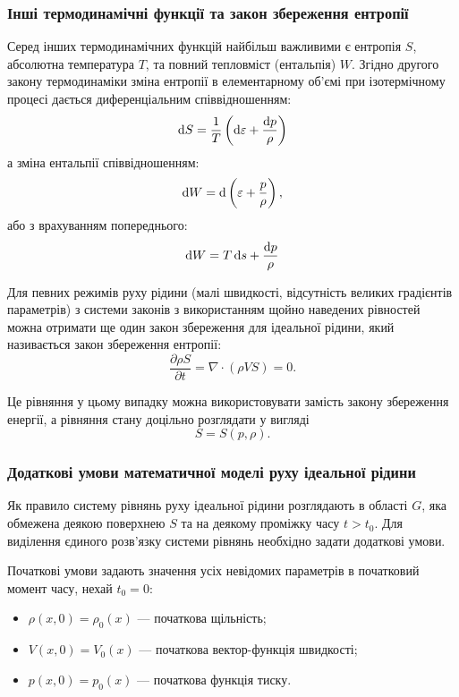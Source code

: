 \subsubsection{Інші термодинамічні функції та закон збереження ентропії}

Серед інших термодинамічних функцій найбільш важливими є ентропія $S$, абсолютна температура $T$, та повний тепловміст (ентальпія) $W$. Згідно другого закону термодинаміки зміна ентропії в елементарному об'ємі при ізотермічному процесі дається диференціальним співвідношенням:
\begin{equation}
	\mathop{}\!\mathrm{d} S = \frac{1}{T} \left( \mathop{}\!\mathrm{d} \varepsilon + \frac{\mathop{}\!\mathrm{d} p}{\rho} \right)
\end{equation}
а зміна ентальпії співвідношенням:
\begin{equation}
	\mathop{}\!\mathrm{d} W = \mathop{}\!\mathrm{d} \left( \varepsilon + \frac{p}{\rho} \right),
\end{equation}
або з врахуванням попереднього:
\begin{equation}
	\mathop{}\!\mathrm{d} W = T \mathop{}\!\mathrm{d} s + \frac{\mathop{}\!\mathrm{d} p}{\rho}
\end{equation}

Для певних режимів руху рідини (малі швидкості, відсутність великих градієнтів параметрів) з системи законів з використанням щойно наведених рівностей можна отримати ще один закон збереження для ідеальної рідини, який називається закон збереження ентропії:
\begin{equation}
	\frac{\partial \rho S}{\partial t} = \nabla \cdot (\rho V S) = 0.
\end{equation}

Це рівняння у цьому випадку можна використовувати замість закону збереження енергії, а рівняння стану доцільно розглядати у вигляді
\begin{equation}
	S = S(p, \rho).
\end{equation}

\subsubsection{Додаткові умови математичної моделі руху ідеальної рідини}

Як правило систему рівнянь руху ідеальної рідини розглядають в області $G$, яка обмежена деякою поверхнею $S$ та на деякому проміжку часу $t > t_0$. Для виділення єдиного розв'язку системи рівнянь необхідно задати додаткові умови. \medskip

Початкові умови задають значення усіх невідомих параметрів в початковий момент часу, нехай $t_ 0 = 0$:
\begin{itemize}
	\item $\rho(x, 0) = \rho_0(x)$ --- початкова щільність;
	\item $V(x, 0) = V_0(x)$ --- початкова вектор-функція швидкості;
	\item $p(x, 0) = p_0(x)$ --- початкова функція тиску.
\end{itemize}


